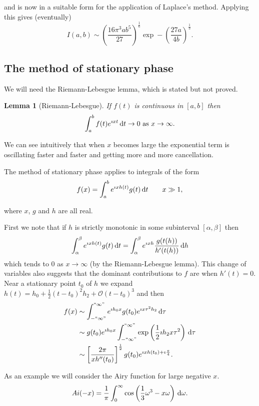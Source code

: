 \documentclass{notes}
\newcommand{\cO}{\mathcal{O}}
\theoremstyle{plain}
\newtheorem*{lemma}{Lemma}
\begin{document}
and is now in a suitable form for the application of Laplace's method.
Applying this gives (eventually)
\[
I(a,b) \sim \left( \frac{16 \pi^3 a b^5}{27} \right)^{\frac{1}{6}}
\exp - \left(\frac{27 a}{4 b} \right)^\frac{1}{3}.
\]

\subsection{The method of stationary phase}

We will need the Riemann-Lebesgue lemma, which is stated but not
proved.

\begin{lemma}[Riemann-Lebesgue]
If $f(t)$ is continuous in $[a,b]$ then
\[
\int_a^b f(t) e^{\imath x t}\, \mathrm{d} t \to 0 \text{ as } x \to \infty.
\]
\end{lemma}

We can see intuitively that when $x$ becomes large the exponential term is
oscillating faster and faster and getting more and more cancellation.

The method of stationary phase applies to integrals of the form
\[
f(x) = \int_a^b e^{\imath x h(t)} g(t)\, \mathrm{d} t \qquad x \gg 1,
\]

where $x$, $g$ and $h$ are all real.

First we note that if $h$ is strictly monotonic in some subinterval
$[\alpha,\beta]$ then
\[
\int_\alpha^\beta e^{\imath x h(t)} g(t)\, \mathrm{d} t
= \int_\alpha^\beta e^{\imath x h} \frac{g(t(h))}{h'(t(h))}\, \mathrm{d} h
\]
which tends to $0$ as $x \to \infty$ (by the Riemann-Lebesgue lemma).
This change of variables also suggests that the dominant contributions to
$f$ are when $h'(t) = 0$.  Near a stationary point $t_0$ of
$h$ we expand $h(t) = h_0 + \frac{1}{2} (t-t_0)^2 h_2 + \cO(t-t_0)^3$
and then
\begin{align*}
f(x) &\sim \int_{-``\infty\text{''}}^{``\infty\text{''}}
e^{\imath h_0 x} g(t_0) e^{\imath x \tau^2 h_2}\, \mathrm{d} \tau \\
&\sim g(t_0) e^{\imath h_0 x} \int_{-``\infty\text{''}}^{``\infty\text{''}}
\exp \left( \frac{1}{2} \imath h_2 x \tau^2 \right)\, \mathrm{d} \tau \\
& \sim \left[ \frac{2 \pi}{x h''(t_0)} \right]^{\frac{1}{2}}
g(t_0) e^{\imath x h(t_0) + \imath \frac{\pi}{4}}.
\end{align*}

As an example we will consider the Airy function for large negative
$x$.
\[
Ai(-x) = \frac{1}{\pi} \int_0^\infty \cos\left( \frac{1}{3}\omega^3
-x \omega \right)\, \mathrm{d} \omega.
\]
\end{document}
